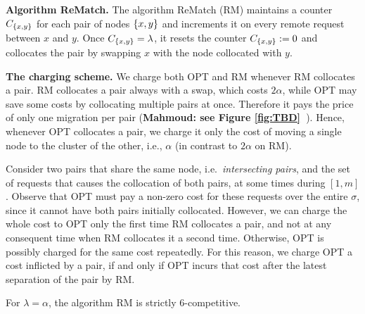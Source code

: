 \documentclass[a4paper,anonymous,USenglish]{lipics-v2019}
\newcommand{\OPT}{\textsc{OPT}\xspace}
\newcommand{\RM}{\textsc{RM}\xspace} %
\DeclarePairedDelimiter\set{\{}{\}}
\newcommand\mahmoud[1]{\color{orange}\textbf{Mahmoud: #1~}\color{black}}
\begin{document}
\medskip

\noindent
\textbf{Algorithm ReMatch.} 
The algorithm ReMatch (\RM) maintains a counter $C_{\set{x,y}}$ for each pair of nodes $\set{x,y}$ and increments it on every remote request between $x$ and $y$.
Once $C_{\set{x,y}} = \lambda$,
it resets the counter $C_{\set{x,y}}:=0$ and collocates the pair by swapping $x$ with the node collocated with $y$.

\medskip

\noindent
\textbf{The charging scheme.}
We charge both \OPT and \RM whenever \RM collocates a pair.%
\RM collocates a pair always with a swap,%
which  costs $2\alpha$,
while \OPT may save some costs by collocating multiple pairs at once.
 Therefore it pays the price of only one migration per pair  (\mahmoud{see Figure \ref{fig:TBD}}).
Hence,
whenever \OPT collocates a pair,
we charge it only the cost of moving a single node to the cluster of the other,
i.e., $\alpha$ (in contrast to $2\alpha$ on \RM).

Consider two  pairs that share the same node, 
i.e.~\emph{intersecting pairs},
and the set of requests that causes the collocation of both pairs,
at some  times during  $[1,m]$.
Observe that \OPT must pay a non-zero cost
for these requests over the entire $\sigma$,
since it cannot have both pairs initially collocated.
However,
we can charge the whole cost to \OPT only the first time \RM collocates a pair,
and not at any consequent time when \RM collocates it a second time.
Otherwise,
 \OPT is possibly charged for the same cost repeatedly.
For this reason,
we charge \OPT a cost inflicted by a pair,
if and only if  \OPT incurs that cost after the latest separation of the pair by \RM.

\begin{theorem} \label{thm:k=2}
	For $\lambda=\alpha$, the algorithm \RM  is strictly 6-competitive.
\end{theorem}
\end{document}
